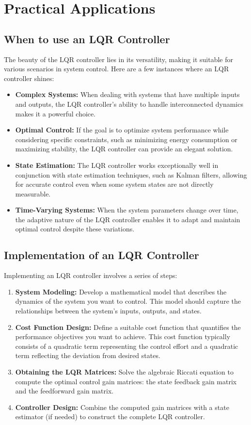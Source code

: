 \documentclass[10pt,twocolumn,twoside,lineno]{pnas-new}
\begin{document}
\section*{Practical Applications}

\subsection*{When to use an LQR Controller}
The beauty of the LQR controller lies in its versatility, making it suitable for various scenarios in system control. Here are a few instances where an LQR controller shines:

\begin{itemize}
    \item \textbf{Complex Systems:} When dealing with systems that have multiple inputs and outputs, the LQR controller's ability to handle interconnected dynamics makes it a powerful choice.
    \item \textbf{Optimal Control:} If the goal is to optimize system performance while considering specific constraints, such as minimizing energy consumption or maximizing stability, the LQR controller can provide an elegant solution.
    \item \textbf{State Estimation:} The LQR controller works exceptionally well in conjunction with state estimation techniques, such as Kalman filters, allowing for accurate control even when some system states are not directly measurable.
    \item \textbf{Time-Varying Systems:} When the system parameters change over time, the adaptive nature of the LQR controller enables it to adapt and maintain optimal control despite these variations.
\end{itemize}

\subsection*{Implementation of an LQR Controller}
Implementing an LQR controller involves a series of steps:

\begin{enumerate}
    \item \textbf{System Modeling:} Develop a mathematical model that describes the dynamics of the system you want to control. This model should capture the relationships between the system's inputs, outputs, and states.
    \item \textbf{Cost Function Design:} Define a suitable cost function that quantifies the performance objectives you want to achieve. This cost function typically consists of a quadratic term representing the control effort and a quadratic term reflecting the deviation from desired states.
    \item \textbf{Obtaining the LQR Matrices:} Solve the algebraic Riccati equation to compute the optimal control gain matrices: the state feedback gain matrix and the feedforward gain matrix.
    \item \textbf{Controller Design:} Combine the computed gain matrices with a state estimator (if needed) to construct the complete LQR controller.
\end{enumerate}
\end{document}
